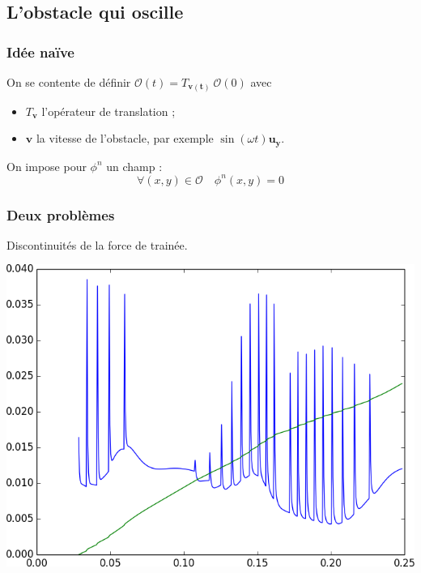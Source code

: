 \documentclass{beamer}
\renewcommand\O{\mathcal{O}}
\newcommand{\vect}[1]{\boldsymbol{#1}}
\begin{document}
  \subsection{L'obstacle qui oscille}
  \begin{frame}
    \frametitle{Idée naïve}
    On se contente de définir $\O(t) = T_{\vect{v(t)}}\ \O(0)$ avec 
    \begin{itemize}
      \item $T_\vect{v}$ l'opérateur de translation ;
      \item $\vect{v}$ la vitesse de l'obstacle, par exemple $\sin(\omega
        t)\vect{u_y}$.
    \end{itemize}
    On impose pour $\phi^n$ un champ :
    \[\forall (x,y)\in\O\quad \phi^n(x,y) = 0\]
  \end{frame}
  \begin{frame}
    \frametitle{Deux problèmes}
    Discontinuités de la force de trainée.
    \begin{center}
      \includegraphics[height=0.7\textheight]{penalisation.png}
    \end{center}
  \end{frame}
\end{document}
